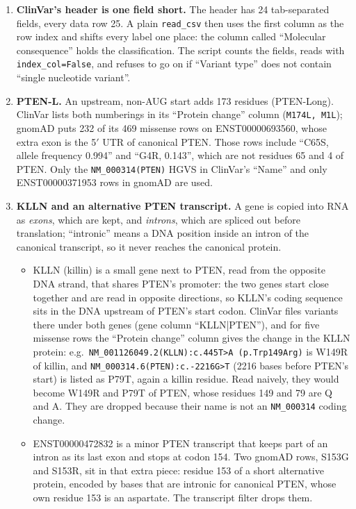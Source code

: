 \documentclass[11pt,a4paper]{article}
\begin{document}
\begin{enumerate}
\item \textbf{ClinVar's header is one field short.} The header has 24
  tab-separated fields, every data row 25. A plain \texttt{read\_csv} then uses
  the first column as the row index and shifts every label one place: the
  column called ``Molecular consequence'' holds the classification. The script
  counts the fields, reads with \texttt{index\_col=False}, and refuses to go on
  if ``Variant type'' does not contain ``single nucleotide variant''.
\item \textbf{PTEN-L.} An upstream, non-AUG start adds 173 residues
  (PTEN-Long). ClinVar lists both numberings in its ``Protein change'' column
  (\texttt{M174L, M1L}); gnomAD puts 232 of its 469 missense rows on
  ENST00000693560, whose extra exon is the 5$'$ UTR of canonical PTEN. Those
  rows include ``C65S, allele frequency 0.994'' and ``G4R, 0.143'', which are
  not residues 65 and 4 of PTEN. Only the \texttt{NM\_000314(PTEN)} HGVS in
  ClinVar's ``Name'' and only ENST00000371953 rows in gnomAD are used.
\item \textbf{KLLN and an alternative PTEN transcript.} A gene is copied into
  RNA as \emph{exons}, which are kept, and \emph{introns}, which are spliced
  out before translation; ``intronic'' means a DNA position inside an intron
  of the canonical transcript, so it never reaches the canonical protein.
  \begin{itemize}
  \item KLLN (killin) is a small gene next to PTEN, read from the opposite
    DNA strand, that shares PTEN's promoter: the two genes start close together and
    are read in opposite directions, so KLLN's coding sequence sits in the
    DNA upstream of PTEN's start codon. ClinVar files variants there under
    both genes (gene column ``KLLN|PTEN''), and for five missense rows the
    ``Protein change'' column gives the change in the KLLN protein: e.g.\
    \texttt{NM\_001126049.2(KLLN):c.445T>A (p.Trp149Arg)} is W149R of killin,
    and \texttt{NM\_000314.6(PTEN):c.-2216G>T} (2216 bases before PTEN's
    start) is listed as P79T, again a killin residue. Read naively, they would
    become W149R and P79T of PTEN, whose residues 149 and 79 are Q and A. They are dropped because their name is not an \texttt{NM\_000314} coding
    change.
  \item ENST00000472832 is a minor PTEN transcript that keeps part of an
    intron as its last exon and stops at codon 154. Two gnomAD rows,
    S153G and S153R, sit in that extra piece: residue 153 of a short
    alternative protein, encoded by bases that are intronic for canonical
    PTEN, whose own residue 153 is an aspartate. The transcript filter drops
    them.
  \end{itemize}
\end{enumerate}
\end{document}
